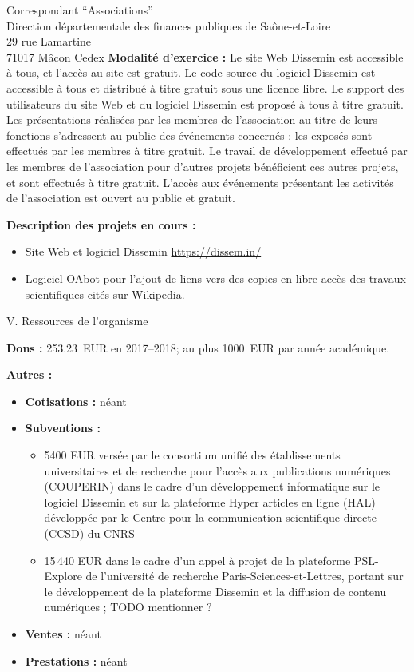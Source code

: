 \documentclass[11pt]{lettre}
\begin{document}
\begin{letter}{Correspondant ``Associations''\\Direction départementale des
  finances publiques de Saône-et-Loire\\29 rue Lamartine\\71017 Mâcon Cedex}
  \textbf{Modalité d'exercice :} Le site Web Dissemin est accessible à tous, et
  l'accès au site est gratuit. Le code source du logiciel Dissemin est
  accessible à tous et distribué à titre gratuit sous une licence libre. Le
  support des utilisateurs du site Web et du logiciel Dissemin est proposé à
  tous à titre gratuit. Les présentations réalisées par les membres de
  l'association au titre de leurs fonctions s'adressent au public des événements
  concernés : les exposés sont effectués par les membres à titre gratuit. Le
  travail de développement effectué par les membres de l'association pour
  d'autres projets bénéficient ces autres projets, et sont effectués à titre
  gratuit. L'accès aux événements présentant les activités de l'association est
  ouvert au public et gratuit.

  \textbf{Description des projets en cours :}

  \begin{itemize}
    \item Site Web et logiciel Dissemin \url{https://dissem.in/}
    \item Logiciel OAbot pour l'ajout de liens vers des copies en libre accès
      des travaux scientifiques cités sur Wikipedia.
  \end{itemize}

  {\Large V. Ressources de l'organisme}

  \textbf{Dons :} 253.23~EUR en 2017--2018; au plus 1000~EUR par année
  académique.

  \textbf{Autres :}

  \begin{itemize}
    \item \textbf{Cotisations :} néant
    \item \textbf{Subventions :}
      \begin{itemize}
        \item 5400 EUR versée par le consortium unifié des
      établissements universitaires et de recherche pour l'accès aux
      publications numériques (COUPERIN) dans le cadre d'un développement
      informatique sur le logiciel Dissemin et sur la plateforme Hyper articles
          en ligne (HAL) développée par le Centre pour la communication
          scientifique directe (CCSD) du CNRS
      \item 15\,440 EUR dans le cadre d'un appel à projet de la plateforme
        PSL-Explore de l'université de recherche Paris-Sciences-et-Lettres,
          portant sur le développement de la plateforme Dissemin et la diffusion
          de contenu numériques ; TODO mentionner ?
      \end{itemize}
    \item \textbf{Ventes :} néant
    \item \textbf{Prestations :} néant
  \end{itemize}


\end{letter}
\end{document}
